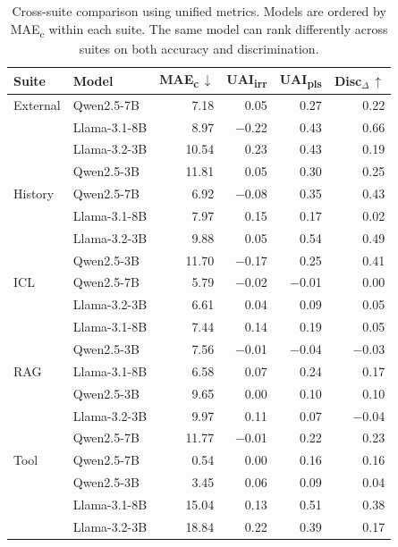 \begin{table}[t]
\centering
\small
\begin{tabular}{@{}llrrrr@{}}
\toprule
\textbf{Suite} & \textbf{Model}
  & \textbf{MAE\textsubscript{c}}$\,\downarrow$
  & \textbf{UAI\textsubscript{irr}}
  & \textbf{UAI\textsubscript{pls}}
  & \textbf{Disc$_{\Delta}$}$\,\uparrow$ \\
\midrule
External & Qwen2.5-7B     & 7.18  & 0.05    & 0.27 & 0.22 \\
         & Llama-3.1-8B   & 8.97  & $-$0.22 & 0.43 & 0.66 \\
         & Llama-3.2-3B   & 10.54 & 0.23    & 0.43 & 0.19 \\
         & Qwen2.5-3B     & 11.81 & 0.05    & 0.30 & 0.25 \\
\midrule
History  & Qwen2.5-7B     & 6.92  & $-$0.08 & 0.35 & 0.43 \\
         & Llama-3.1-8B   & 7.97  & 0.15    & 0.17 & 0.02 \\
         & Llama-3.2-3B   & 9.88  & 0.05    & 0.54 & 0.49 \\
         & Qwen2.5-3B     & 11.70 & $-$0.17 & 0.25 & 0.41 \\
\midrule
ICL      & Qwen2.5-7B     & 5.79  & $-$0.02 & $-$0.01 & 0.00 \\
         & Llama-3.2-3B   & 6.61  & 0.04    & 0.09 & 0.05 \\
         & Llama-3.1-8B   & 7.44  & 0.14    & 0.19 & 0.05 \\
         & Qwen2.5-3B     & 7.56  & $-$0.01 & $-$0.04 & $-$0.03 \\
\midrule
RAG      & Llama-3.1-8B   & 6.58  & 0.07    & 0.24 & 0.17 \\
         & Qwen2.5-3B     & 9.65  & 0.00    & 0.10 & 0.10 \\
         & Llama-3.2-3B   & 9.97  & 0.11    & 0.07 & $-$0.04 \\
         & Qwen2.5-7B     & 11.77 & $-$0.01 & 0.22 & 0.23 \\
\midrule
Tool     & Qwen2.5-7B     & 0.54  & 0.00    & 0.16 & 0.16 \\
         & Qwen2.5-3B     & 3.45  & 0.06    & 0.09 & 0.04 \\
         & Llama-3.1-8B   & 15.04 & 0.13    & 0.51 & 0.38 \\
         & Llama-3.2-3B   & 18.84 & 0.22    & 0.39 & 0.17 \\
\bottomrule
\end{tabular}
\caption{Cross-suite comparison using unified metrics.
  Models are ordered by MAE\textsubscript{c} within each
  suite.  The same model can rank differently across suites
  on both accuracy and discrimination.}
\label{tab:cross_suite}
\end{table}

